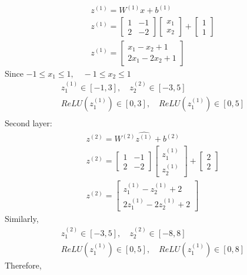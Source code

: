 \documentclass{article}
\begin{document}
\begin{align}
    z^{(1)} = W^{(1)}x+b^{(1)}\\
    z^{(1)} = \begin{bmatrix}1 & -1 \\ 2 & -2\end{bmatrix}\begin{bmatrix}x_1 \\ x_2\end{bmatrix}+\begin{bmatrix}1 \\ 1 \end{bmatrix}\\
    z^{(1)} = \begin{bmatrix}x_1 - x_2 + 1 \\ 2x_1 - 2x_2 +1 \end{bmatrix}
\end{align}
Since $-1 \leq x_1 \leq 1, \quad -1 \leq x_2 \leq 1$
\begin{align}
    z^{(1)}_1 \in [-1,3],\quad z^{(2)}_2 \in [-3,5]\\
    ReLU(z^{(1)}_1) \in [0,3], \quad ReLU(z^{(1)}_1) \in [0,5]\\
\end{align}
Second layer:
\begin{align}
    z^{(2)} = W^{(2)}\hat{z^{(1)}}+b^{(2)}\\
    z^{(2)} = \begin{bmatrix}1 & -1 \\ 2 & -2\end{bmatrix}\begin{bmatrix}z^{(1)}_1 \\ z^{(1)}_2\end{bmatrix}+\begin{bmatrix}2 \\ 2 \end{bmatrix}\\
    z^{(2)} = \begin{bmatrix}z^{(1)}_1 - z^{(1)}_2 + 2 \\ 2z^{(1)}_1 - 2z^{(1)}_2 +2 \end{bmatrix}
\end{align}
Similarly,
\begin{align}
    z^{(2)}_1 \in [-3,5],\quad z^{(2)}_2 \in [-8,8]\\
    ReLU(z^{(1)}_1) \in [0,5], \quad ReLU(z^{(1)}_1) \in [0,8]
\end{align}
Therefore,
\end{document}
